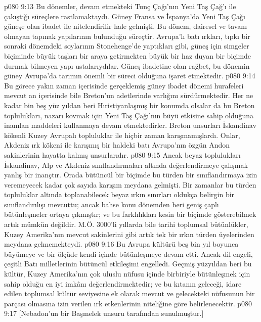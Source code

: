 \vs p080 9:13 Bu dönemler, devam etmekteki Tunç Çağı’nın Yeni Taş Çağ’ı ile çakıştığı süreçlere rastlamaktaydı. Güney Fransa ve İspanya’da Yeni Taş Çağı güneşe olan ibadet ile nitelendirilir hale gelmişti. Bu dönem, dairesel ve tavanı olmayan tapınak yapılarının bulunduğu süreçtir. Avrupa’lı batı ırkları, tıpkı bir sonraki dönemdeki soylarının Stonehenge’de yaptıkları gibi, güneş için simgeler biçiminde büyük taşları bir araya getirmekten büyük bir haz duyan bir biçimde durmak bilmeyen yapı ustalarıydılar. Güneş ibadetine olan rağbet, bu dönemin güney Avrupa’da tarımın önemli bir süreci olduğuna işaret etmektedir.
\vs p080 9:14 Bu görece yakın zaman içerisinde gerçeklemiş güney ibadet dönemi hurafeleri mevcut an içerisinde bile Breton’un adetlerinde varlığını sürdürmektedir. Her ne kadar bin beş yüz yıldan beri Hıristiyanlaşmış bir konumda olsalar da bu Breton toplulukları, nazarı kovmak için Yeni Taş Çağı’nın büyü etkisine sahip olduğuna inanılan maddeleri kullanmaya devam etmektedirler. Breton unsurları İskandinav kökenli Kuzey Avrupalı topluluklar ile hiçbir zaman karışmamışlardı. Onlar, Akdeniz ırk kökeni ile karışmış bir haldeki batı Avrupa’nın özgün Andon sakinlerinin hayatta kalmış unsurlarıdır.
\vs p080 9:15 Ancak beyaz toplulukları İskandinav, Alp ve Akdeniz sınıflandırmaları altında değerlendirmeye çalışmak yanlış bir inançtır. Orada bütüncül bir biçimde bu türden bir sınıflandırmaya izin veremeyecek kadar çok sayıda karışım meydana gelmişti. Bir zamanlar bu türden topluluklar altında toplanabilecek beyaz ırkın sınırları oldukça belirgin bir sınıflandırılışı mevcuttu; ancak bahse konu dönemden beri geniş çaplı bütünleşmeler ortaya çıkmıştır; ve bu farklılıkları kesin bir biçimde gösterebilmek artık mümkün değildir. M.Ö. 3000’li yıllarda bile tarihi toplumsal bütünlükler, Kuzey Amerika’nın mevcut sakinlerini gibi artık tek bir ırkın türden üyelerinden meydana gelmemekteydi.
\vs p080 9:16 Bu Avrupa kültürü beş bin yıl boyunca büyümeye ve bir ölçüde kendi içinde bütünleşmeye devam etti. Ancak dil engeli, çeşitli Batı milletlerinin bütüncül etkileşimi engelledi. Geçmiş yüzyıldan beri bu kültür, Kuzey Amerika’nın çok uluslu nüfusu içinde birbiriyle bütünleşmek için sahip olduğu en iyi imkânı değerlendirmektedir; ve bu kıtanın geleceği, idare edilen toplumsal kültür seviyesine ek olarak mevcut ve gelecekteki nüfusunun bir parçası olmasına izin verilen ırk etkenlerinin niteliğine göre belirlenecektir.
\vs p080 9:17 [Nebadon’un bir Başmelek unsuru tarafından sunulmuştur.]
